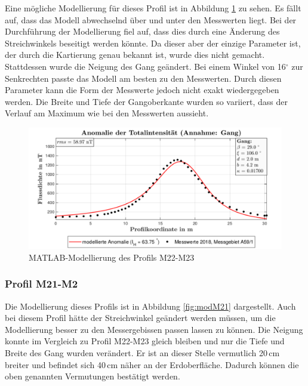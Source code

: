 Eine mögliche Modellierung für dieses Profil ist in Abbildung \ref{fig:modM22} zu sehen. Es fällt auf, dass das Modell abwechselnd über und unter den Messwerten liegt. Bei der Durchführung der Modellierung fiel auf, dass dies durch eine Änderung des Streichwinkels beseitigt werden könnte. Da dieser aber der einzige Parameter ist, der durch die Kartierung genau bekannt ist, wurde dies nicht gemacht. Stattdessen wurde die Neigung des Gang geändert. Bei einem Winkel von 16$^\circ$ zur Senkrechten passte das Modell am besten zu den Messwerten. Durch diesen Parameter kann die Form der Messwerte jedoch nicht exakt wiedergegeben werden. Die Breite und Tiefe der Gangoberkante wurden so variiert, dass der Verlauf am Maximum wie bei den Messwerten aussieht.

\begin{figure}
 \centering
 \includegraphics[width=\textwidth]{fig/modM22}
 \caption{MATLAB-Modellierung des Profils M22-M23}
 \label{fig:modM22}
\end{figure}

\subsubsection{Profil M21-M2}

Die Modellierung dieses Profils ist in Abbildung \ref{fig:modM21} dargestellt. Auch bei diesem Profil hätte der Streichwinkel geändert werden müssen, um die Modellierung besser zu den Messergebissen passen lassen zu können. Die Neigung konnte im Vergleich zu Profil M22-M23 gleich bleiben und nur die Tiefe und Breite des Gang wurden verändert. Er ist an dieser Stelle vermutlich 20\,cm breiter und befindet sich 40\,cm näher an der Erdoberfläche. Dadurch können die oben genannten Vermutungen bestätigt werden.

